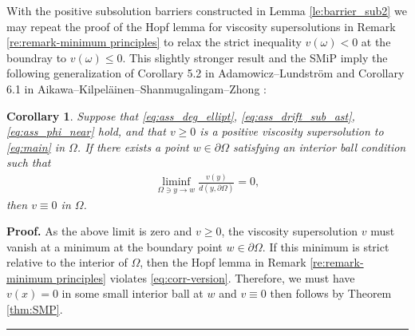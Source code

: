 \documentclass[12pt]{article}
\newtheorem{corollary}[theorem]{Corollary}
\newtheorem{remark}[theorem]{Remark}
\newenvironment{proof}[1][Proof]{\textbf{#1.} }{\ \rule{0.5em}{0.5em}}
\numberwithin{komcounter}{section}
\begin{document}


With the positive subsolution barriers constructed in Lemma \ref{le:barrier_sub2} we may repeat the proof of the Hopf lemma for viscosity supersolutions in Remark \ref{re:remark-minimum principles} to relax the strict inequality $v(\omega) < 0$ at the boundray to $v(\omega)\leq 0$.
This slightly stronger result and the SMiP imply the following generalization of %
Corollary 5.2 in Adamowicz--Lundstr\"om \cite{AL16} and Corollary 6.1 in Aikawa--Kilpel\"ainen--Shanmugalingam--Zhong \cite{AKSZ07}:

\begin{corollary}
Suppose that \eqref{eq:ass_deg_ellipt}, \eqref{eq:ass_drift_sub_ast}, \eqref{eq:ass_phi_near} hold,
and that $v \geq 0$ is a positive viscosity supersolution to \eqref{eq:main} in $\Omega$.
If there exists a point $w \in \partial \Omega$ satisfying an interior ball condition such that
%
\begin{align}\label{eq:corr-version}
\liminf_{\Omega \ni y \to w} \frac{v(y)}{d(y,\partial \Omega)} = 0,
\end{align}
%
then $v\equiv 0$ in $\Omega$.
\end{corollary}
%
\begin{proof}
 As the above limit is zero and $v \geq 0$,
the viscosity supersolution $v$ must vanish at a minimum at the boundary point $w \in \partial \Omega$.
If this minimum is strict relative to the interior of $\Omega$,
then the Hopf lemma in Remark \ref{re:remark-minimum principles} violates \eqref{eq:corr-version}.
Therefore, we must have $v(x) = 0$ in some small interior ball at $w$ and $v \equiv 0$ then follows by Theorem \ref{thm:SMP}.
\end{proof}\\

\end{document}
